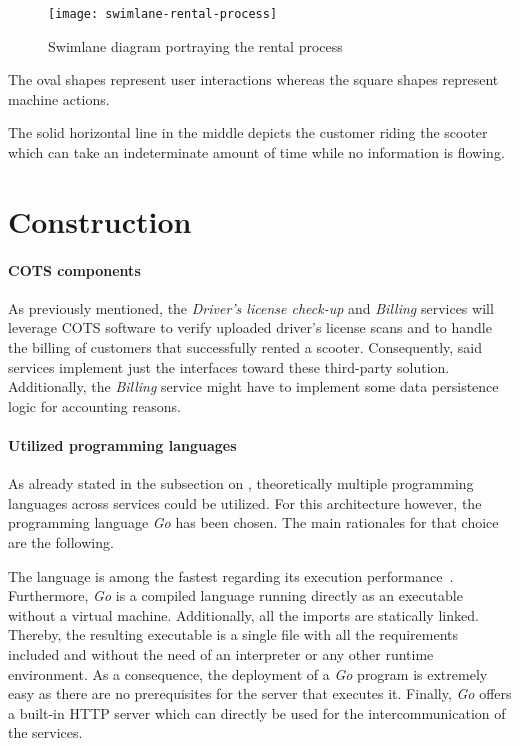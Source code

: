 \documentclass[12pt,a4paper,twoside]{report}
\begin{document}
\begin{figure}[htbp]
\centering
\texttt{[image: swimlane-rental-process]}
\caption{Swimlane diagram portraying the rental process}
\label{fig:swimlane-rental-process}
\end{figure}

The oval shapes represent user interactions whereas the square shapes represent
machine actions.

The solid horizontal line in the middle depicts the customer riding the scooter
which can take an indeterminate amount of time while no information is flowing.


\section{Construction} \label{subsect:analysis-construction}

\paragraph{COTS components}
As previously mentioned, the \textit{Driver's license check-up} and \textit{Billing}
services will leverage COTS software to verify uploaded driver's license scans
and to handle the billing of customers that successfully rented a scooter.
Consequently, said services implement just the interfaces toward these
third-party solution. Additionally, the \textit{Billing} service might have
to implement some data persistence logic for accounting reasons.

\paragraph{Utilized programming languages}
As already stated in the subsection on \textit{},
theoretically multiple programming languages across services could be utilized.
For this architecture however, the programming language \textit{Go} has been chosen.
The main rationales for that choice are the following.

The language is among the fastest regarding its execution performance~\cite{golang-fast}.
Furthermore, \textit{Go} is a compiled language running directly as an executable
without a virtual machine. Additionally, all the imports are statically linked.
Thereby, the resulting executable is a single file with all the requirements
included and without the need of an interpreter or any other runtime environment.
As a consequence, the deployment of a \textit{Go} program is extremely easy as
there are no prerequisites for the server that executes it.
Finally, \textit{Go} offers a built-in HTTP server which can directly be used
for the intercommunication of the services.
\end{document}
